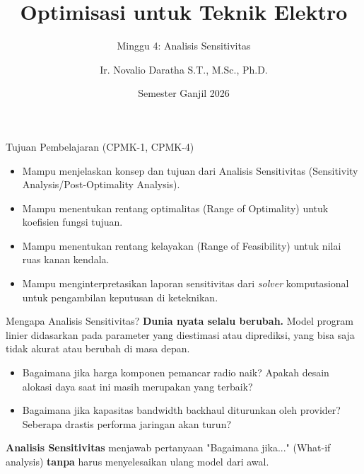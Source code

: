\documentclass[aspectratio=169]{beamer}
\title{Optimisasi untuk Teknik Elektro}
\subtitle{Minggu 4: Analisis Sensitivitas}
\author{Ir. Novalio Daratha S.T., M.Sc., Ph.D.}
\date{Semester Ganjil 2026}
\begin{document}
\begin{frame}
    \titlepage
\end{frame}

\begin{frame}{Tujuan Pembelajaran (CPMK-1, CPMK-4)}
    \begin{itemize}
        \item Mampu menjelaskan konsep dan tujuan dari Analisis Sensitivitas (Sensitivity Analysis/Post-Optimality Analysis).
        \item Mampu menentukan rentang optimalitas (Range of Optimality) untuk koefisien fungsi tujuan.
        \item Mampu menentukan rentang kelayakan (Range of Feasibility) untuk nilai ruas kanan kendala.
        \item Mampu menginterpretasikan laporan sensitivitas dari \textit{solver} komputasional untuk pengambilan keputusan di keteknikan.
    \end{itemize}
\end{frame}

\begin{frame}{Mengapa Analisis Sensitivitas?}
    \textbf{Dunia nyata selalu berubah.} Model program linier didasarkan pada parameter yang diestimasi atau diprediksi, yang bisa saja tidak akurat atau berubah di masa depan.
    \vspace{0.3cm}
    \begin{itemize}
        \item Bagaimana jika harga komponen pemancar radio naik? Apakah desain alokasi daya saat ini masih merupakan yang terbaik?
        \item Bagaimana jika kapasitas bandwidth backhaul diturunkan oleh provider? Seberapa drastis performa jaringan akan turun?
    \end{itemize}
    \textbf{Analisis Sensitivitas} menjawab pertanyaan "Bagaimana jika..." (What-if analysis) \textbf{tanpa} harus menyelesaikan ulang model dari awal.
\end{frame}
\end{document}
